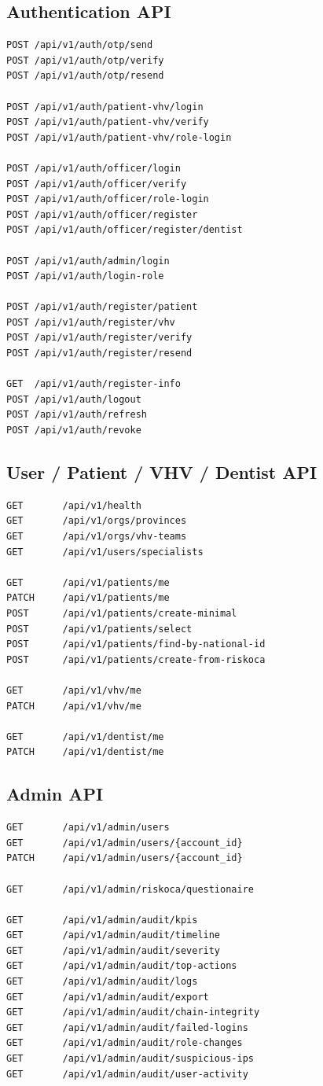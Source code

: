\subsection*{Authentication API}
\begin{verbatim}
POST /api/v1/auth/otp/send
POST /api/v1/auth/otp/verify
POST /api/v1/auth/otp/resend

POST /api/v1/auth/patient-vhv/login
POST /api/v1/auth/patient-vhv/verify
POST /api/v1/auth/patient-vhv/role-login

POST /api/v1/auth/officer/login
POST /api/v1/auth/officer/verify
POST /api/v1/auth/officer/role-login
POST /api/v1/auth/officer/register
POST /api/v1/auth/officer/register/dentist

POST /api/v1/auth/admin/login
POST /api/v1/auth/login-role

POST /api/v1/auth/register/patient
POST /api/v1/auth/register/vhv
POST /api/v1/auth/register/verify
POST /api/v1/auth/register/resend

GET  /api/v1/auth/register-info
POST /api/v1/auth/logout
POST /api/v1/auth/refresh
POST /api/v1/auth/revoke
\end{verbatim}

\subsection*{User / Patient / VHV / Dentist API}
\begin{verbatim}
GET       /api/v1/health
GET       /api/v1/orgs/provinces
GET       /api/v1/orgs/vhv-teams
GET       /api/v1/users/specialists

GET       /api/v1/patients/me
PATCH     /api/v1/patients/me
POST      /api/v1/patients/create-minimal
POST      /api/v1/patients/select
POST      /api/v1/patients/find-by-national-id
POST      /api/v1/patients/create-from-riskoca

GET       /api/v1/vhv/me
PATCH     /api/v1/vhv/me

GET       /api/v1/dentist/me
PATCH     /api/v1/dentist/me
\end{verbatim}

\subsection*{Admin API}
\begin{verbatim}
GET       /api/v1/admin/users
GET       /api/v1/admin/users/{account_id}
PATCH     /api/v1/admin/users/{account_id}

GET       /api/v1/admin/riskoca/questionaire

GET       /api/v1/admin/audit/kpis
GET       /api/v1/admin/audit/timeline
GET       /api/v1/admin/audit/severity
GET       /api/v1/admin/audit/top-actions
GET       /api/v1/admin/audit/logs
GET       /api/v1/admin/audit/export
GET       /api/v1/admin/audit/chain-integrity
GET       /api/v1/admin/audit/failed-logins
GET       /api/v1/admin/audit/role-changes
GET       /api/v1/admin/audit/suspicious-ips
GET       /api/v1/admin/audit/user-activity
\end{verbatim}

